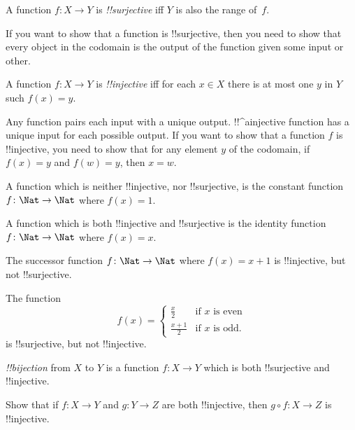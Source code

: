 \documentclass[../../include/open-logic-section]{subfiles}
\begin{document}

\begin{defn}
A function $f \colon X \rightarrow Y$ is \emph{!!{surjective}} iff $Y$ is also
the range of~$f$.
\end{defn}

\begin{explain}
If you want to show that a function is !!{surjective}, then you need
to show that every object in the codomain is the output of the
function given some input or other.
\end{explain}

\begin{defn}
A function $f \colon X \rightarrow Y$ is \emph{!!{injective}} iff for
each $x \in X$ there is at most one $y$ in $Y$ such $f(x) = y$.
\end{defn}

\begin{explain}
Any function pairs each input with a unique output. !!^a{injective} function has a unique input for each possible output. If you want to show that a function $f$ is !!{injective}, you need to show that for any element $y$ of the codomain, if $f(x)=y$ and $f(w)=y$, then $x=w$.

A function which is neither !!{injective}, nor !!{surjective}, is the constant function $f\colon \Nat \rightarrow \Nat$ where $f(x) = 1$.
    
A function which is both !!{injective} and !!{surjective} is the identity function $f\colon \Nat \rightarrow \Nat$ where $f(x) = x$.

The successor function $f \colon \Nat \rightarrow \Nat$ where $f(x) = x+1$ is !!{injective}, but not !!{surjective}.

The function 
\[
f(x) = 
\begin{cases}
  \frac{x}{2} & \text{if $x$ is even} \\
  \frac{x+1}{2} & \text{if $x$ is odd.}
\end{cases}
\]
is !!{surjective}, but not !!{injective}.

\end{explain}

\begin{defn}
 \emph{!!{bijection}} from $X$ to $Y$ is a
function $f \colon X \rightarrow Y$ which is both !!{surjective} and
!!{injective}.
\end{defn}

\begin{prob}
Show that if $f \colon X \to Y$ and $g \colon Y \to Z$ are both
!!{injective}, then $g \circ f \colon X \to Z$ is !!{injective}.
\end{prob}
\end{document}
